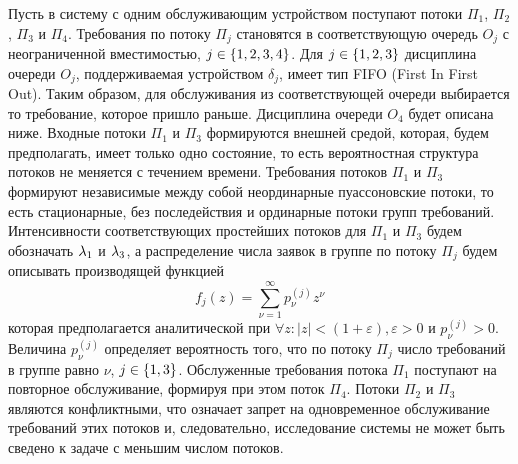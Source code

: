 \documentclass[a4paper,12pt,russian]{extarticle}
\begin{document}
Пусть в систему с одним обслуживающим устройством поступают потоки $\Pi_1$, $\Pi_2$, $\Pi_3$  и $\Pi_4$. Требования по потоку $\Pi_j$ становятся в соответствующую очередь $O_j$ с неограниченной вместимостью, $j\in \left\{1, 2, 3, 4\right\}$. Для $j \in \left\{1, 2, 3\right\}$ дисциплина очереди $O_j$, поддерживаемая устройством $\delta_j$, имеет тип FIFO (First In First Out). Таким образом, для обслуживания из соответствующей очереди выбирается то требование, которое пришло раньше. Дисциплина очереди $O_4$ будет описана ниже. Входные потоки $\Pi_1$ и $\Pi_3$ формируются внешней средой, которая, будем предполагать, имеет только одно состояние, то есть вероятностная структура потоков не меняется с течением времени. Требования потоков $\Pi_1$ и $\Pi_3$ формируют независимые между собой неординарные пуассоновские потоки, то есть  стационарные, без последействия и ординарные потоки групп требований. Интенсивности соответствующих простейших потоков для $\Pi_1$ и $\Pi_3$ будем обозначать $\lambda_1$ и $\lambda_3$, а распределение числа заявок в группе по потоку $\Pi_j$ будем описывать производящей функцией
\begin{equation}
f_j(z) = \sum_{\nu=1}^{\infty} p_{\nu}^{(j)} z ^{\nu}
\end{equation}
которая предполагается аналитической при $\forall z \colon |z|<(1+\varepsilon), \varepsilon > 0$ и $p_{\nu}^{(j)}>0$. Величина $p_{\nu}^{(j)}$ определяет вероятность того, что по потоку $\Pi_j$ число требований в группе равно $\nu$, $j\in \left\{1,3\right\}$. Обслуженные требования потока $\Pi_1$ поступают на повторное обслуживание, формируя при этом поток $\Pi_4$. Потоки $\Pi_2$ и $\Pi_3$ являются конфликтными, что означает запрет на одновременное обслуживание требований этих потоков и, следовательно, исследование системы не может быть сведено к задаче с меньшим числом потоков. 
 
\end{document}
